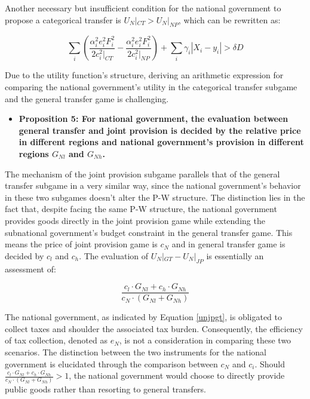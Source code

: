 Another necessary but insufficient condition for the national government to propose a categorical transfer is $U_N|_{CT} > U_N|_{NP}$, which can be rewritten as:

\begin{equation}
    \sum_i(\frac{\alpha_i^2e_i^2F_i^2}{2c_i^2|_{CT}}-\frac{\alpha_i^2e_i^2F_i^2}{2c_i^2|_{NP}}) +\sum_i\gamma_i|X_i-y_i|>\delta D
\end{equation}

Due to the utility function's structure, deriving an arithmetic expression for comparing the national government's utility in the categorical transfer subgame and the general transfer game is challenging.%

\begin {itemize}
\item \textbf{Proposition 5: For national government, the evaluation between general transfer and joint provision is decided by the relative price in different regions and national government's provision in different regions $G_{Nl}$ and $G_{Nh}$.}
\end{itemize}


The mechanism of the joint provision subgame parallels that of the general transfer subgame in a very similar way, since the national government's behavior in these two subgames doesn't alter the P-W structure. The distinction lies in the fact that, despite facing the same P-W structure, the national government provides goods directly in the joint provision game while extending the subnational government's budget constraint in the general transfer game. This means the price of joint provision game is $c_N$ and in general transfer game is decided by $c_l$ and $c_h$. The evaluation of $U_N|_{GT}-U_N|_{JP}$ is essentially an assessment of:%


\begin{equation}
    \frac{c_l\cdot G_{Nl}+c_h\cdot G_{Nh}}{c_N\cdot (G_{Nl}+G_{Nh})}\label{unjpgt}
\end{equation} %

The national government, as indicated by Equation \ref{unjpgt}, is obligated to collect taxes and shoulder the associated tax burden. Consequently, the efficiency of tax collection, denoted as $e_N$, is not a consideration in comparing these two scenarios. The distinction between the two instruments for the national government is elucidated through the comparison between $c_N$ and $c_i$. Should $\frac{c_l\cdot G_{Nl}+c_h\cdot G_{Nh}}{c_N\cdot (G_{Nl}+G_{Nh})}>1$, the national government would choose to directly provide public goods rather than resorting to general transfers. %

